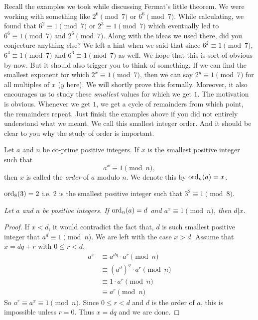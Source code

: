 \documentclass{subfile}
\begin{document}
Recall the examples we took while discussing Fermat's little theorem. We were working with something like $2^6\pmod7$ or $6^6\pmod7$. While calculating, we found that $6^2\equiv1\pmod7$ or $2^3\equiv1\pmod7$ which eventually led to $6^6\equiv1\pmod7$ and $2^6\pmod7$. Along with the ideas we used there, did you conjecture anything else? We left a hint when we said that since $6^2\equiv1\pmod7$, $6^4\equiv1\pmod7$ and $6^6\equiv1\pmod7$ as well. We hope that this is sort of obvious by now. But it should also trigger you to think of something. If we can find the smallest exponent for which $2^x\equiv1\pmod7$, then we can say $2^y\equiv1\pmod7$ for all multiples of $x$ ($y$ here). We will shortly prove this formally. Moreover, it also encourages us to study these \textit{smallest }values for which we get $1$. The motivation is obvious. Whenever we get $1$, we get a cycle of remainders from which point, the remainders repeat. Just finish the examples above if you did not entirely understand what we meant. We call this smallest integer order. And it should be clear to you why the study of order is important.
	\begin{definition}
		Let $a$ and $n$ be co-prime positive integers. If $x$ is the smallest positive integer such that  \[a^x\equiv1\pmod n,\] then $x$ is called the \textit{order} of $a$ modulo $n$. We denote this by $\operatorname{ord}_n(a)=x$.
	\end{definition}

	\begin{example}
		$\operatorname{ord}_8(3)=2$ i.e. $2$ is the smallest positive integer such that  $3^2\equiv1\pmod 8$.
	\end{example}


	\begin{theorem}\slshape\label{thm:ordDiv}
		Let $a$ and $n$ be positive integers. If $\operatorname{ord}_n(a)=d$ and $a^x\equiv1\pmod n$, then $d|x$.
	\end{theorem}

	\begin{proof}
		If $x<d$, it would contradict the fact that, $d$ is such smallest positive integer that $a^d\equiv1\pmod n$. We are left with the case $x>d$. Assume that $x=dq+r$ with $0\leq r<d$.
			\begin{align*}
				a^x
					& \equiv a^{dq}\cdot a^r\pmod{n}\\
					& \equiv (a^d)^q \cdot a^r\pmod{n}\\
					& \equiv 1 \cdot a^r\pmod{n}\\
					& \equiv a^r \pmod n
			\end{align*}
		So $a^r \equiv a^x \equiv 1 \pmod n$. Since $0\leq r<d$ and $d$ is the order of $a$, this is impossible unless $r=0$. Thus $x=dq$ and we are done.
	\end{proof}
\end{document}
